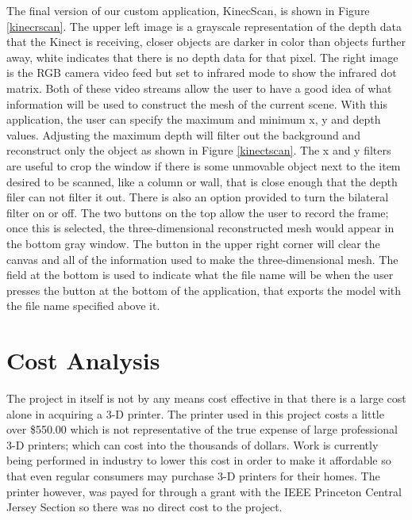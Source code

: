 \documentclass[pdftex,10.5pt]{report}
\begin{document}
The final version of our custom application, KinecScan, is shown in Figure \ref{kinecrscan}. The upper left image is a grayscale representation of the depth data that the Kinect is receiving, closer objects are darker in color than objects further away, white indicates that there is no depth data for that pixel. The right image is the RGB camera video feed but set to infrared mode to show the infrared dot matrix. Both of these video streams allow the user to have a good idea of what information will be used to construct the mesh of the current scene. With this application, the user can specify the maximum and minimum x, y and depth values. Adjusting the maximum depth will filter out the background and reconstruct only the object as shown in Figure \ref{kinectscan}. The x and y filters are useful to crop the window if there is some unmovable object next to the item desired to be scanned, like a column or wall, that is close enough that the depth filer can not filter it out. There is also an option provided to turn the bilateral filter on or off. The two buttons on the top allow the user to record the frame; once this is selected, the three-dimensional reconstructed mesh would appear in the bottom gray window. The button in the upper right corner will clear the canvas and all of the information used to make the three-dimensional mesh. The field at the bottom is used to indicate what the file name will be when the user presses the button at the bottom of the application, that exports the model with the file name specified above it.

\section{Cost Analysis}
The project in itself is not by any means cost effective in that there is a large cost alone in acquiring a 3-D printer. The printer used in this project costs a little over \$550.00 which is not representative of the true expense of large professional 3-D printers; which can cost into the thousands of dollars. Work is currently being performed in industry to lower this cost in order to make it affordable so that even regular consumers may purchase 3-D printers for their homes. \cite{cite9} The printer however, was payed for through a grant with the IEEE Princeton Central Jersey Section so there was no direct cost to the project. 
\end{document}
